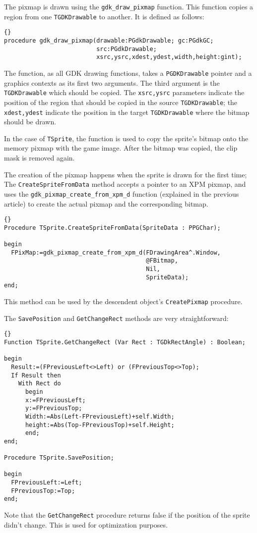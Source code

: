 \documentclass[10pt]{article}
\newcommand{\var}[1]{\texttt{#1}}
\begin{document}
The pixmap is drawn using the \var{gdk\_draw\_pixmap} function. This
function copies a region from one \var{TGDKDrawable} to another.
It is defined as follows:
\begin{lstlisting}{}
procedure gdk_draw_pixmap(drawable:PGdkDrawable; gc:PGdkGC; 
                          src:PGdkDrawable; 
                          xsrc,ysrc,xdest,ydest,width,height:gint);
\end{lstlisting}{}
The function, as all GDK drawing functions, takes a \var{PGDKDrawable} 
pointer and a graphics contexts as its first two arguments. The third
argument is the \var{TGDKDrawable} which should be copied. The
\var{xsrc,ysrc} parameters indicate the position of the region that should
be copied in the source \var{TGDKDrawable}; the \var{xdest,ydest} indicate 
the position in the target \var{TGDKDrawable} where the bitmap should be
drawn.

In the case of \var{TSprite}, the function is used to copy the sprite's 
bitmap onto the memory pixmap with the game image. After the bitmap was
copied, the clip mask is removed again.

The creation of the pixmap happens when the sprite is drawn for the first
time; The \var{CreateSpriteFromData} method accepts a pointer to an XPM
pixmap, and uses the \var{gdk\_pixmap\_create\_from\_xpm\_d} function
(explained in the previous article) to create the actual pixmap and the 
corresponding bitmap.
\begin{lstlisting}{}
Procedure TSprite.CreateSpriteFromData(SpriteData : PPGChar);

begin
  FPixMap:=gdk_pixmap_create_from_xpm_d(FDrawingArea^.Window, 
                                        @FBitmap,
                                        Nil,
                                        SpriteData);
end;
\end{lstlisting}{}
This method can be used by the descendent object's \var{CreatePixmap} 
procedure.

The \var{SavePosition} and \var{GetChangeRect} methods are very
straightforward:
\begin{lstlisting}{}
Function TSprite.GetChangeRect (Var Rect : TGDkRectAngle) : Boolean;

begin
  Result:=(FPreviousLeft<>Left) or (FPreviousTop<>Top);
  If Result then
    With Rect do
      begin
      x:=FPreviousLeft;
      y:=FPreviousTop;
      Width:=Abs(Left-FPreviousLeft)+self.Width;
      height:=Abs(Top-FPreviousTop)+self.Height;
      end;
end;

Procedure TSprite.SavePosition;

begin
  FPreviousLeft:=Left;
  FPreviousTop:=Top;
end;
\end{lstlisting}{}
Note that the \var{GetChangeRect} procedure returns false if the position
of the sprite didn't change. This is used for optimization purposes.
\end{document}
